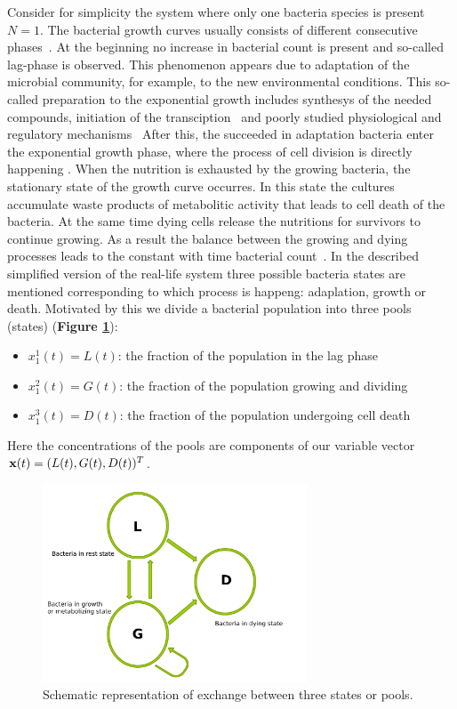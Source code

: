 \documentclass[10pt,A4paper]{article}
\begin{document}
Consider for simplicity the system where only one bacteria species is present $N=1$.
The bacterial growth curves usually consists of different consecutive phases~\cite{buchanan_when_1997}.
At the beginning no increase in bacterial count is present and so-called lag-phase is observed.
This phenomenon appears due to adaptation of the microbial community, for example, to the new environmental conditions.
This so-called preparation to the exponential growth includes synthesys of the needed compounds, initiation of the transciption~\cite{rolfe_lag_2012} and poorly studied physiological and regulatory mechanisms~\cite{monod_growth_1949}
After this, the succeeded in adaptation bacteria enter the exponential growth phase, where the process of cell division is directly happening .
When the nutrition is exhausted by the growing bacteria, the stationary state of the growth curve occurres.
In this state the cultures accumulate waste products of metabolitic activity that leads to cell death of the bacteria.
At the same time dying cells release the nutritions for survivors to continue growing.
As a result the balance between the growing and dying processes leads to the constant with time bacterial count~\cite{navarro_llorens_stationary_2010}.
In the described simplified version of the real-life system three possible bacteria states are mentioned corresponding to which process is happeng: adaplation, growth or death.
Motivated by this we divide a bacterial population into three pools (states) (\textbf{Figure \ref{fig:SchematicRep}}): 
\begin{itemize}
\item $x^1_1 (t) = L(t)$: the fraction of the population in the lag phase
\item $x^2_1 (t) = G(t)$: the fraction of the population growing and dividing
\item $x^3_1 (t) = D(t)$: the fraction of the population undergoing cell death
\end{itemize}
Here the concentrations of the pools are components of our variable vector $\mathbf{x} (t) = (L(t), G(t), D(t))^T$.

\begin{figure}[t]
    \begin{center}
    \includegraphics[width=0.7\textwidth]{Figures/TPM_fig.pdf}
    \caption{{\footnotesize Schematic representation of exchange between three states or pools.}}
    \label{fig:SchematicRep}
    \end{center}
\end{figure}
\end{document}
